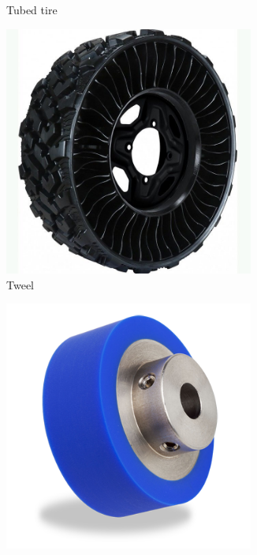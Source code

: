 \documentclass[10pt,letterpaper]{book}
\begin{document}
\begin{figure}[H]
\begin{subfigure}[b]{.19\linewidth}
			\caption{Tubed tire}
		\end{subfigure}\begin{subfigure}[b]{.19\linewidth}
			\includegraphics[width=0.9\textwidth]{imgs/tweel.jpeg}
			\caption{Tweel}
		\end{subfigure}\begin{subfigure}[b]{.19\linewidth}
			\includegraphics[width=0.9\textwidth]{imgs/wheel_fairlane.png}

\end{subfigure}
\end{figure}
\end{document}
